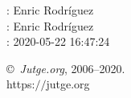 \documentclass[11pt]{article}
\begin{document}
    \newcommand{\SampleTwoCol}{\SampleTwoColInputOutput{sample}{}}
    \newcommand{\SampleOneCol}{\SampleOneColInputOutput{sample}{}}

    \ProblemInformation
    \Author: Enric Rodríguez\\    \Translator: Enric Rodríguez\\
    \Generation: 2020-05-22 16:47:24

    \bigskip

    \copyright\ \emph{Jutge.org}, 2006--2020. \\
    https:$/\!\!/$jutge.org
\end{document}
